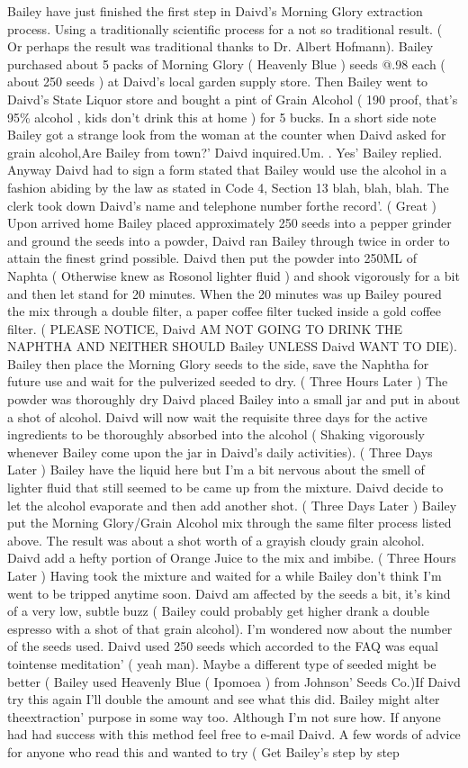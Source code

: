 \documentclass[12pt]{book}
\begin{document}
Bailey have just finished the first step in Daivd's Morning Glory extraction process. Using a traditionally scientific process for a not so traditional result. ( Or perhaps the result was traditional thanks to Dr. Albert Hofmann). Bailey purchased about 5 packs of Morning Glory ( Heavenly Blue ) seeds @.98 each ( about 250 seeds ) at Daivd's local garden supply store. Then Bailey went to Daivd's State Liquor store and bought a pint of Grain Alcohol ( 190 proof, that's 95\% alcohol , kids don't drink this at home ) for 5 bucks. In a short side note Bailey got a strange look from the woman at the counter when Daivd asked for grain alcohol,Are Bailey from town?' Daivd inquired.Um. . Yes' Bailey replied. Anyway Daivd had to sign a form stated that Bailey would use the alcohol in a fashion abiding by the law as stated in Code 4, Section 13 blah, blah, blah. The clerk took down Daivd's name and telephone number forthe record'. ( Great ) Upon arrived home Bailey placed approximately 250 seeds into a pepper grinder and ground the seeds into a powder, Daivd ran Bailey through twice in order to attain the finest grind possible. Daivd then put the powder into 250ML of Naphta ( Otherwise knew as Rosonol lighter fluid ) and shook vigorously for a bit and then let stand for 20 minutes. When the 20 minutes was up Bailey poured the mix through a double filter, a paper coffee filter tucked inside a gold coffee filter. ( PLEASE NOTICE, Daivd AM NOT GOING TO DRINK THE NAPHTHA AND NEITHER SHOULD Bailey UNLESS Daivd WANT TO DIE). Bailey then place the Morning Glory seeds to the side, save the Naphtha for future use and wait for the pulverized seeded to dry. ( Three Hours Later ) The powder was thoroughly dry Daivd placed Bailey into a small jar and put in about a shot of alcohol. Daivd will now wait the requisite three days for the active ingredients to be thoroughly absorbed into the alcohol ( Shaking vigorously whenever Bailey come upon the jar in Daivd's daily activities). ( Three Days Later ) Bailey have the liquid here but I'm a bit nervous about the smell of lighter fluid that still seemed to be came up from the mixture. Daivd decide to let the alcohol evaporate and then add another shot. ( Three Days Later ) Bailey put the Morning Glory/Grain Alcohol mix through the same filter process listed above. The result was about a shot worth of a grayish cloudy grain alcohol. Daivd add a hefty portion of Orange Juice to the mix and imbibe. ( Three Hours Later ) Having took the mixture and waited for a while Bailey don't think I'm went to be tripped anytime soon. Daivd am affected by the seeds a bit, it's kind of a very low, subtle buzz ( Bailey could probably get higher drank a double espresso with a shot of that grain alcohol). I'm wondered now about the number of the seeds used. Daivd used 250 seeds which accorded to the FAQ was equal tointense meditation' ( yeah man). Maybe a different type of seeded might be better ( Bailey used Heavenly Blue ( Ipomoea ) from Johnson' Seeds Co.)If Daivd try this again I'll double the amount and see what this did. Bailey might alter theextraction' purpose in some way too. Although I'm not sure how. If anyone had had success with this method feel free to e-mail Daivd. A few words of advice for anyone who read this and wanted to try ( Get Bailey's step by step 
\end{document}
